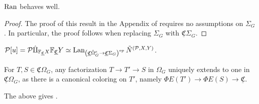 \documentclass[a4paper,10pt
,draft
]{article}%
\newcommand{\UC}{\underline{\mathfrak C}}
\renewcommand{\1}{\ensuremath{\mathbb{id}}}
\begin{document}
\begin{proposition}
      [{cf. \cite[Prop 5.37]{BP17}}]
      $\operatorname{Ran}$ behaves well.
\end{proposition}
\begin{proof}
      The proof of this result in the Appendix of \cite{BP17} requires no assumptions on $\Sigma_G$.
      In particular, the proof follows when replacing $\Sigma_G$ with $\UC\Sigma_G$.
\end{proof}

\begin{corollary}
      $\mathcal P[u] = \mathcal P \hat\amalg_{\mathbb F_{\UC}X}\mathbb F_{\UC}Y
      \simeq
      \Lan_{\left(\UC\hat\Omega_G^e \to \UC\Sigma_G\right)^{op}}\tilde N^{(\mathcal P, X, Y)}$.
\end{corollary}


\begin{remark}
      For $T,S \in \UC\Omega_G$, any factorization $T \to T' \to S$ in $\Omega_G$ uniquely extends to one in $\UC\Omega_G$,
      as there is a canonical coloring on $T'$, namely $\Phi E(T') \to \Phi E(S) \to \UC$. 
\end{remark}

The above gives \cite[Lem 5.57]{BP17}.
\end{document}
